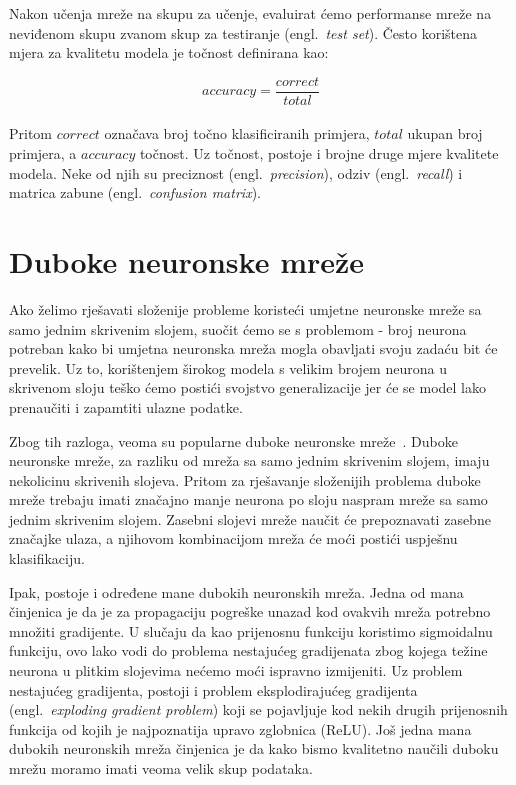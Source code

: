 \documentclass[times, utf8, zavrsni, numeric]{fer}
\begin{document}
Nakon učenja mreže na skupu za učenje, evaluirat ćemo performanse mreže na neviđenom skupu zvanom skup za testiranje (engl.\ \textit{test set}). Često korištena mjera za kvalitetu modela je točnost definirana kao:

\begin{equation}
    accuracy = \frac{correct}{total}
    \label{eq:accuracy}
\end{equation}
\\
Pritom $correct$ označava broj točno klasificiranih primjera, $total$ ukupan broj primjera, a $accuracy$ točnost.
Uz točnost, postoje i brojne druge mjere kvalitete modela. Neke od njih su preciznost (engl.\ \textit{precision}), odziv (engl.\ \textit{recall}) i matrica zabune (engl.\ \textit{confusion matrix}).

\section{Duboke neuronske mreže}
Ako želimo rješavati složenije probleme koristeći umjetne neuronske mreže sa samo jednim skrivenim slojem, suočit ćemo se s problemom - broj neurona potreban kako bi umjetna neuronska mreža mogla obavljati svoju zadaću bit će prevelik.
Uz to, korištenjem širokog modela s velikim brojem neurona u skrivenom sloju teško ćemo postići svojstvo generalizacije jer će se model lako prenaučiti i zapamtiti ulazne podatke. 

Zbog tih razloga, veoma su popularne duboke neuronske mreže~\cite{Goodfellow-et-al-2016}. Duboke neuronske mreže, za razliku od mreža sa samo jednim skrivenim slojem, imaju nekolicinu skrivenih slojeva. 
Pritom za rješavanje složenijih problema duboke mreže trebaju imati značajno manje neurona po sloju naspram mreže sa samo jednim skrivenim slojem. 
Zasebni slojevi mreže naučit će prepoznavati zasebne značajke ulaza, a njihovom kombinacijom mreža će moći postići uspješnu klasifikaciju.

Ipak, postoje i određene mane dubokih neuronskih mreža. Jedna od mana činjenica je da je za propagaciju pogreške unazad kod ovakvih mreža potrebno množiti gradijente. 
U slučaju da kao prijenosnu funkciju koristimo sigmoidalnu funkciju, ovo lako vodi do problema nestajućeg gradijenata zbog kojega težine neurona u plitkim slojevima nećemo moći ispravno izmijeniti.
Uz problem nestajućeg gradijenta, postoji i problem eksplodirajućeg gradijenta (engl.\ \textit{exploding gradient problem}) koji se pojavljuje kod nekih drugih prijenosnih funkcija od kojih je najpoznatija upravo zglobnica (ReLU).
Još jedna mana dubokih neuronskih mreža činjenica je da kako bismo kvalitetno naučili duboku mrežu moramo imati veoma velik skup podataka.
\end{document}
